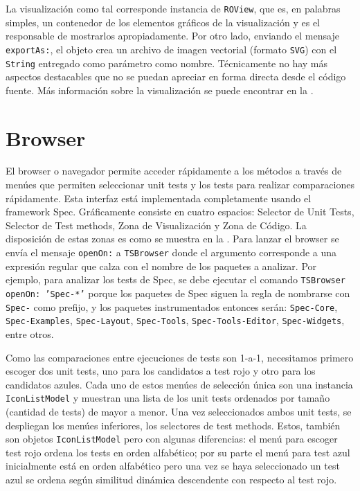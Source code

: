 \par La visualización como tal corresponde instancia de {\tt ROView}, que es, en palabras simples, un contenedor de los elementos gráficos de la visualización y es el responsable de mostrarlos apropiadamente. Por otro lado, enviando el mensaje {\tt exportAs:}, el objeto crea un archivo de imagen vectorial (formato {\tt SVG}) con el {\tt String} entregado como parámetro como nombre. Técnicamente no hay más aspectos destacables que no se puedan apreciar en forma directa desde el código fuente. Más información sobre la visualización se puede encontrar en la . 

\section{Browser}
\par El browser o navegador permite acceder rápidamente a los métodos a través de menúes que permiten seleccionar unit tests y los tests para realizar comparaciones rápidamente.  Esta interfaz está implementada completamente usando el framework Spec. Gráficamente consiste en cuatro espacios: Selector de Unit Tests, Selector de Test methods, Zona de Visualización y Zona de Código. La disposición de estas zonas es como se muestra en la . Para lanzar el browser se envía el mensaje {\tt openOn:} a {\tt TSBrowser} donde el argumento corresponde a una expresión regular que calza con el nombre de los paquetes a analizar. Por ejemplo, para analizar los tests de Spec, se debe ejecutar el comando {\tt TSBrowser openOn: 'Spec-*'} porque los paquetes de Spec siguen la regla de nombrarse con {\tt Spec-} como prefijo, y los paquetes instrumentados entonces serán: {\tt Spec-Core}, {\tt Spec-Examples}, {\tt Spec-Layout}, {\tt Spec-Tools}, {\tt Spec-Tools-Editor}, {\tt Spec-Widgets}, entre otros.  

\par Como las comparaciones entre ejecuciones de tests son 1-a-1, necesitamos primero escoger dos unit tests, uno para los candidatos a test rojo y otro para los candidatos azules. Cada uno de estos menúes de selección única son una instancia {\tt IconListModel} y muestran una lista de los unit tests ordenados por tamaño (cantidad de tests) de mayor a menor. Una vez seleccionados ambos unit tests, se despliegan los menúes inferiores, los selectores de test methods. Estos, también son objetos {\tt IconListModel} pero con algunas diferencias: el menú para escoger test rojo ordena los tests en orden alfabético; por su parte el menú para test azul inicialmente está en orden alfabético pero una vez se haya seleccionado un test azul se ordena según similitud dinámica descendente con respecto al test rojo. 

